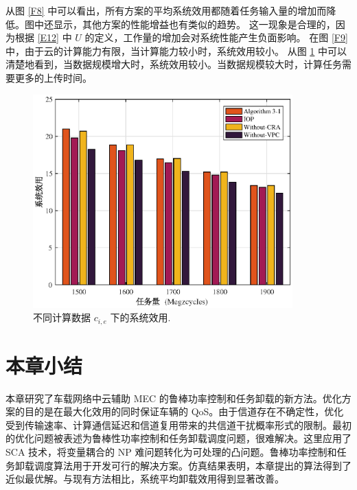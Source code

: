 从图 \ref{F8} 中可以看出，所有方案的平均系统效用都随着任务输入量的增加而降低。图中还显示，其他方案的性能增益也有类似的趋势。
这一现象是合理的，因为根据 \eqref{E12} 中 $U$ 的定义，工作量的增加会对系统性能产生负面影响。
在图 \ref{F9} 中，由于云的计算能力有限，当计算能力较小时，系统效用较小。
从图 \ref{F10} 中可以清楚地看到，当数据规模增大时，系统效用较小。当数据规模较大时，计算任务需要更多的上传时间。
\begin{figure}[H]
\centering
\includegraphics[width=10cm]{figures//chap3//diff_c.eps}
\caption{不同计算数据 $c_{i,e}$ 下的系统效用.}
\label{F10}
\end{figure}
\section{本章小结}\label{section3-5}
本章研究了车载网络中云辅助 MEC 的鲁棒功率控制和任务卸载的新方法。优化方案的目的是在最大化效用的同时保证车辆的 QoS。由于信道存在不确定性，优化受到传输速率、计算通信延迟和信道复用带来的共信道干扰概率形式的限制。最初的优化问题被表述为鲁棒性功率控制和任务卸载调度问题，很难解决。这里应用了 SCA 技术，将变量耦合的 NP 难问题转化为可处理的凸问题。鲁棒功率控制和任务卸载调度算法用于开发可行的解决方案。仿真结果表明，本章提出的算法得到了近似最优解。与现有方法相比，系统平均卸载效用得到显著改善。

%

